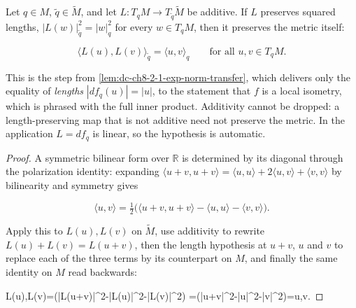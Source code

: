 \begin{lemma}
  \label{lem:dc-ch8-2-1-polarization}
  \leanok
  Let $q\in M$, $\tilde q\in\tilde M$, and let $L:T_qM\to T_{\tilde q}\tilde M$ be additive. If
  $L$ preserves squared lengths, $|L(w)|^2_{\tilde q}=|w|^2_q$ for every $w\in T_qM$, then it
  preserves the metric itself:

  $$
  \langle L(u),L(v)\rangle_{\tilde q} = \langle u,v\rangle_q
  \qquad\text{for all } u,v\in T_qM .
  $$

  This is the step from \cref{lem:dc-ch8-2-1-exp-norm-transfer}, which delivers only the
  equality of \emph{lengths} $|df_q(u)|=|u|$, to the statement that $f$ is a local isometry,
  which is phrased with the full inner product. Additivity cannot be dropped: a
  length-preserving map that is not additive need not preserve the metric. In the application
  $L=df_q$ is linear, so the hypothesis is automatic.
\end{lemma}
\begin{proof}
  \leanok
\sketch
  A symmetric bilinear form over $\mathbb R$ is determined by its diagonal through the
  polarization identity: expanding $\langle u+v,u+v\rangle=\langle u,u\rangle+2\langle
  u,v\rangle+\langle v,v\rangle$ by bilinearity and symmetry gives

  $$
  \langle u,v\rangle=\tfrac12\big(\langle u+v,u+v\rangle-\langle u,u\rangle-\langle
  v,v\rangle\big).
  $$

  Apply this to $L(u),L(v)$ on $\tilde M$, use additivity to rewrite $L(u)+L(v)=L(u+v)$, then
  the length hypothesis at $u+v$, $u$ and $v$ to replace each of the three terms by its
  counterpart on $M$, and finally the same identity on $M$ read backwards:

  \langle L(u),L(v)\rangle=\big(|L(u+v)|^2-|L(u)|^2-|L(v)|^2\big)
  =\big(|u+v|^2-|u|^2-|v|^2\big)=\langle u,v\rangle. \qquad

\end{proof}

